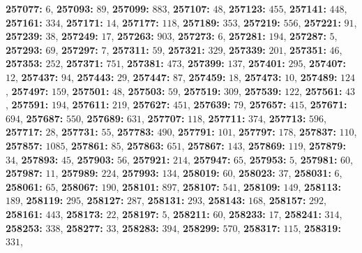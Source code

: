 \textsf{\bfseries 257077:} $6$, \textsf{\bfseries 257093:} $89$, \textsf{\bfseries 257099:} $883$, \textsf{\bfseries 257107:} $48$, \textsf{\bfseries 257123:} $455$, \textsf{\bfseries 257141:} $448$, \textsf{\bfseries 257161:} $334$, \textsf{\bfseries 257171:} $14$, \textsf{\bfseries 257177:} $118$, \textsf{\bfseries 257189:} $353$, \textsf{\bfseries 257219:} $556$, \textsf{\bfseries 257221:} $91$, \textsf{\bfseries 257239:} $38$, \textsf{\bfseries 257249:} $17$, \textsf{\bfseries 257263:} $903$, \textsf{\bfseries 257273:} $6$, \textsf{\bfseries 257281:} $194$, \textsf{\bfseries 257287:} $5$, \textsf{\bfseries 257293:} $69$, \textsf{\bfseries 257297:} $7$, \textsf{\bfseries 257311:} $59$, \textsf{\bfseries 257321:} $329$, \textsf{\bfseries 257339:} $201$, \textsf{\bfseries 257351:} $46$, \textsf{\bfseries 257353:} $252$, \textsf{\bfseries 257371:} $751$, \textsf{\bfseries 257381:} $473$, \textsf{\bfseries 257399:} $137$, \textsf{\bfseries 257401:} $295$, \textsf{\bfseries 257407:} $12$, \textsf{\bfseries 257437:} $94$, \textsf{\bfseries 257443:} $29$, \textsf{\bfseries 257447:} $87$, \textsf{\bfseries 257459:} $18$, \textsf{\bfseries 257473:} $10$, \textsf{\bfseries 257489:} $124$, \textsf{\bfseries 257497:} $159$, \textsf{\bfseries 257501:} $48$, \textsf{\bfseries 257503:} $59$, \textsf{\bfseries 257519:} $309$, \textsf{\bfseries 257539:} $122$, \textsf{\bfseries 257561:} $43$, \textsf{\bfseries 257591:} $194$, \textsf{\bfseries 257611:} $219$, \textsf{\bfseries 257627:} $451$, \textsf{\bfseries 257639:} $79$, \textsf{\bfseries 257657:} $415$, \textsf{\bfseries 257671:} $694$, \textsf{\bfseries 257687:} $550$, \textsf{\bfseries 257689:} $631$, \textsf{\bfseries 257707:} $118$, \textsf{\bfseries 257711:} $374$, \textsf{\bfseries 257713:} $596$, \textsf{\bfseries 257717:} $28$, \textsf{\bfseries 257731:} $55$, \textsf{\bfseries 257783:} $490$, \textsf{\bfseries 257791:} $101$, \textsf{\bfseries 257797:} $178$, \textsf{\bfseries 257837:} $110$, \textsf{\bfseries 257857:} $1085$, \textsf{\bfseries 257861:} $85$, \textsf{\bfseries 257863:} $651$, \textsf{\bfseries 257867:} $143$, \textsf{\bfseries 257869:} $119$, \textsf{\bfseries 257879:} $34$, \textsf{\bfseries 257893:} $45$, \textsf{\bfseries 257903:} $56$, \textsf{\bfseries 257921:} $214$, \textsf{\bfseries 257947:} $65$, \textsf{\bfseries 257953:} $5$, \textsf{\bfseries 257981:} $60$, \textsf{\bfseries 257987:} $11$, \textsf{\bfseries 257989:} $224$, \textsf{\bfseries 257993:} $134$, \textsf{\bfseries 258019:} $60$, \textsf{\bfseries 258023:} $37$, \textsf{\bfseries 258031:} $6$, \textsf{\bfseries 258061:} $65$, \textsf{\bfseries 258067:} $190$, \textsf{\bfseries 258101:} $897$, \textsf{\bfseries 258107:} $541$, \textsf{\bfseries 258109:} $149$, \textsf{\bfseries 258113:} $189$, \textsf{\bfseries 258119:} $295$, \textsf{\bfseries 258127:} $287$, \textsf{\bfseries 258131:} $293$, \textsf{\bfseries 258143:} $168$, \textsf{\bfseries 258157:} $292$, \textsf{\bfseries 258161:} $443$, \textsf{\bfseries 258173:} $22$, \textsf{\bfseries 258197:} $5$, \textsf{\bfseries 258211:} $60$, \textsf{\bfseries 258233:} $17$, \textsf{\bfseries 258241:} $314$, \textsf{\bfseries 258253:} $338$, \textsf{\bfseries 258277:} $33$, \textsf{\bfseries 258283:} $394$, \textsf{\bfseries 258299:} $570$, \textsf{\bfseries 258317:} $115$, \textsf{\bfseries 258319:} $331$, 
